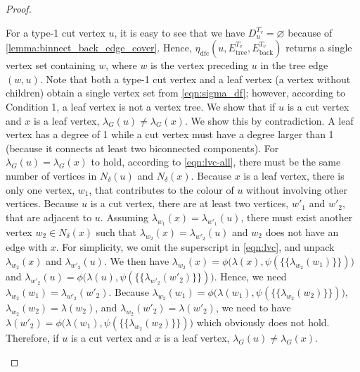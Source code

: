 \begin{proof}
\begin{itemize}
    For a type-1 cut vertex $u$, it is easy to see that we have $D^{T_v}_u = \varnothing$ because of \cref{lemma:binnect_back_edge_cover}. Hence, $\eta_{\text{dfc}}(u,E_{\text{tree}}^{T_v},E_{\text{back}}^{T_v})$ returns a single vertex set containing $w$, where $w$ is the vertex preceding $u$ in the tree edge $(w,u)$. Note that both a type-1 cut vertex and a leaf vertex (a vertex without children) obtain a single vertex set from \cref{eqn:sigma_df}; however, according to Condition 1, a leaf vertex is not a vertex tree. We show that if $u$ is a cut vertex and $x$ is a leaf vertex, $\lambda_G(u)\neq \lambda_G(x)$. We show this by contradiction. A leaf vertex has a degree of 1 while a cut vertex must have a degree larger than 1 (because it connects at least two biconnected components). For $\lambda_G(u) = \lambda_G(x)$ to hold, according to \cref{eqn:lvc-all}, there must be the same number of vertices in $N_{\delta}(u)$ and $N_{\delta}(x)$. 
    Because $x$ is a leaf vertex, there is only one vertex, $w_1$, that contributes to the colour of $u$ without involving other vertices.
    Because $u$ is a cut vertex, there are at least two vertices, $w'_1$ and $w'_2$, that are adjacent to $u$.
    Assuming $\lambda_{w_1}(x) = \lambda_{w'_1}(u)$, there must exist another vertex $ w_2 \in N_{\delta}(x)$ such that $\lambda_{w_2}(x) = \lambda_{w'_2}(u)$ and $w_2$ does not have an edge with $x$. For simplicity, we omit the superscript in \cref{eqn:lvc}, and unpack $\lambda_{w_2}(x)$ and $\lambda_{w'_2}(u)$. We then have 
    $\lambda_{w_2}(x) = \phi \big(  \lambda(x), \psi\left( \{\!\!\{\lambda_{w_2}(w_1)\}\!\!\} \right) \big)$
    and $\lambda_{w'_2}(u) = \phi\big( \lambda(u), \psi\left( \{\!\!\{\lambda_{w'_2}(w'_2)\}\!\!\} \right) \big)$.
    Hence, we need $\lambda_{w_2}(w_1) = \lambda_{w'_2}(w'_2)$.
    Because $\lambda_{w_2}(w_1) = \phi\big(\lambda(w_1),  \psi(\{\!\!\{ \lambda_{w_2}(w_2) \}\!\!\})\big)$,  $\lambda_{w_2}(w_2) = \lambda(w_2)$, and $\lambda_{w_2}(w'_2) = \lambda(w'_2)$, 
    we need to have $\lambda(w'_2) = \phi\big(\lambda(w_1), \psi(\{\!\!\{ \lambda_{w_2}(w_2) \}\!\!\})\big)$ which obviously does not hold. Therefore, if $u$ is a cut vertex and $x$ is a leaf vertex, $\lambda_G(u)\neq \lambda_G(x)$.


\end{itemize}
\end{proof}
